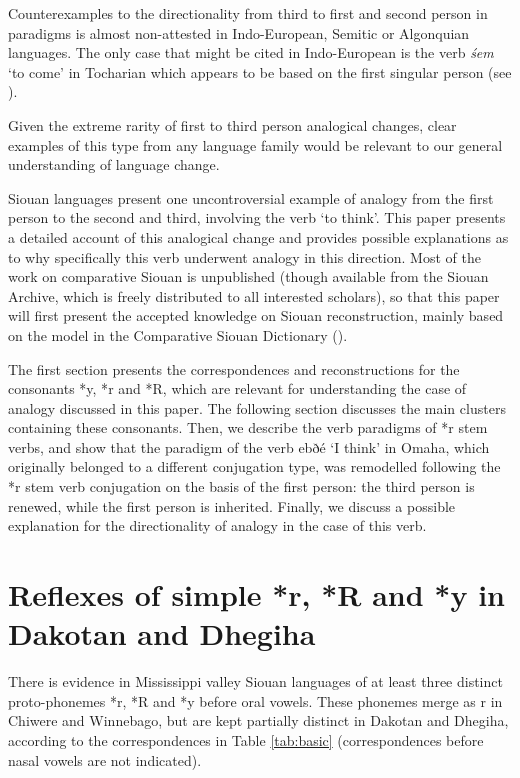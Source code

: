 \documentclass[oldfontcommands,oneside,a4paper,11pt]{article}
\newcommand{\ipa}[1]{{\phon#1}} %
\begin{document}
Counterexamples to the directionality from third to first and second person in paradigms is almost non-attested in Indo-European, Semitic or Algonquian languages. The only case that might be cited in Indo-European is the verb \textit{śem} `to come' in Tocharian which appears to be based on the first singular person (see \citealt{kim01venit}).

Given the extreme rarity of first to third person analogical changes,   clear examples of this type from any language family would be relevant to our general understanding of language change.

 Siouan languages  present one uncontroversial example  of analogy from the first person to the second and third,  involving the verb `to think'. This paper presents a detailed account of this analogical change and provides possible explanations as to why specifically this verb underwent analogy in this direction. Most of the work on comparative Siouan is unpublished (though available from the Siouan Archive, which is freely distributed to all interested scholars), so that this paper will first present the accepted knowledge on Siouan reconstruction, mainly based on the model in the Comparative Siouan Dictionary (\citealt{csd2006}). 

 The first section presents the correspondences and reconstructions for the  consonants *\ipa{y}, *\ipa{r} and *\ipa{R}, which are relevant for understanding the case of analogy discussed in this paper. The following section discusses the main clusters containing these consonants. Then, we describe the verb paradigms of *\ipa{r} stem verbs, and show that the paradigm of the verb  \ipa{ebðé} `I think' in Omaha, which originally belonged to a different conjugation type, was remodelled following the *\ipa{r} stem verb conjugation on the basis of the first person: the third  person is renewed, while the first person is inherited. Finally, we discuss a possible explanation for the directionality of analogy in the case of this verb.
 

 
 

\section{Reflexes of simple *r, *R and *y in Dakotan and Dhegiha}
There is evidence in Mississippi valley Siouan languages of at least three distinct proto-phonemes *\ipa{r}, *\ipa{R} and *\ipa{y} before oral vowels. These phonemes merge as \ipa{r} in Chiwere and Winnebago, but are kept partially distinct in Dakotan and Dhegiha, according to the   correspondences in   Table \ref{tab:basic} (correspondences before nasal vowels are not indicated). 
\end{document}
